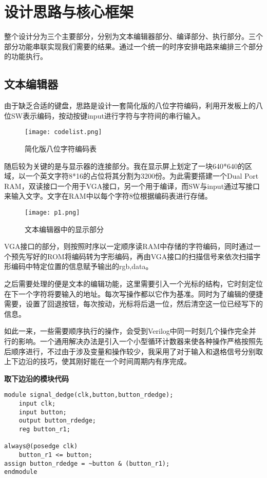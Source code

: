 \documentclass[lang=cn,11pt,a4paper]{elegantpaper}
\begin{document}
\section{设计思路与核心框架}

整个设计分为三个主要部分，分别为文本编辑器部分、编译部分、执行部分。三个部分功能串联实现我们需要的结果。通过一个统一的时序安排电路来编排三个部分的功能执行。

\subsection{文本编辑器}

由于缺乏合适的键盘，思路是设计一套简化版的八位字符编码，利用开发板上的八位SW表示编码，按动按键input进行字符与字符间的串行输入。

\begin{figure}[H]
	\centering
	\texttt{[image: codelist.png]}
	\caption{简化版八位字符编码表}
\end{figure}

随后较为关键的是与显示器的连接部分。我在显示屏上划定了一块640*640的区域，以一个英文字符8*16的占位将其分割为3200份。为此需要搭建一个Dual Port RAM，双读接口一个用于VGA接口，另一个用于编译，而SW与input通过写接口来输入文字。文字在RAM中以每个字符8位根据编码表进行存储。

\begin{figure}[H]
	\centering
	\texttt{[image: p1.png]}
	\caption{文本编辑器中的显示部分}
\end{figure}

VGA接口的部分，则按照时序以一定顺序读RAM中存储的字符编码，同时通过一个预先写好的ROM将编码转为字形编码，再由VGA接口的扫描信号来依次扫描字形编码中特定位置的信息赋予输出的rgb,data。

之后需要处理的便是文本的编辑功能，这里需要引入一个光标的结构，它时刻定位在下一个字符将要输入的地址。每次写操作都以它作为基准。同时为了编辑的便捷需要，设置了回退按钮，每次按动，光标将后退一位，然后清空这一位已经写下的信息。

如此一来，一些需要顺序执行的操作，会受到Verilog中同一时刻几个操作完全并行的影响。一个通用解决办法是引入一个小型循环计数器来使各种操作严格按照先后顺序进行，不过由于涉及变量和操作较少，我采用了对于输入和退格信号分别取上下边沿的技巧，使其刚好能在一个时间周期内有序完成。

\textbf{取下边沿的模块代码}
\begin{lstlisting}
module signal_dedge(clk,button,button_rdedge);
    input clk;
    input button;
    output button_rdedge;
    reg button_r1;

always@(posedge clk)
    button_r1 <= button;
assign button_rdedge = ~button & (button_r1);
endmodule
\end{lstlisting}
\end{document}
